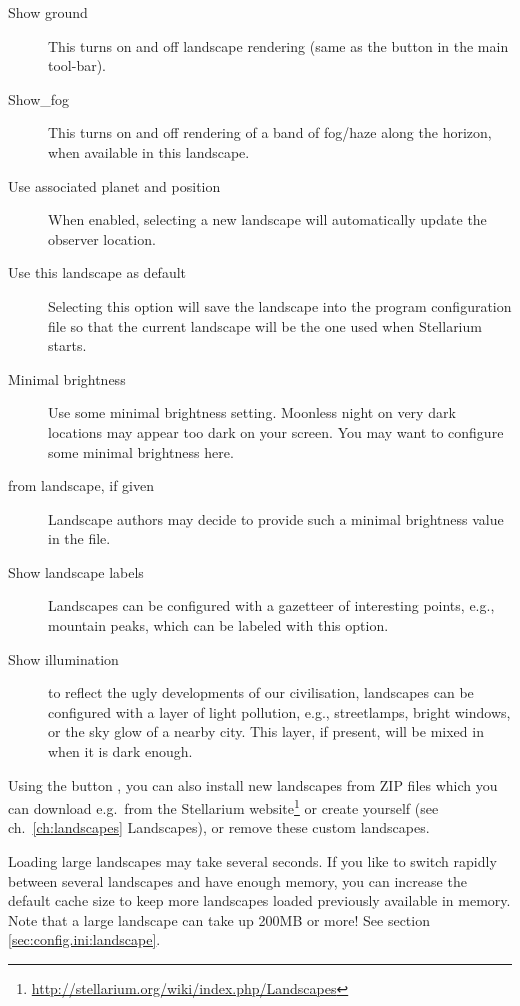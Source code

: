 \begin{description}
\item[Show ground] This turns on and off landscape rendering (same
  as the button  in the main tool-bar).
\item[Show\_fog] This turns on and off rendering of a band of
  fog/haze along the horizon, when available in this landscape.
\item[Use associated planet and position] When enabled, selecting a
  new landscape will automatically update the observer location.
\item[Use this landscape as default] Selecting this option will save
  the landscape into the program configuration file so that the current
  landscape will be the one used when Stellarium starts.
\item[Minimal brightness] Use some minimal brightness
  setting. Moonless night on very dark locations may appear too dark
  on your screen. You may want to configure some minimal brightness
  here.
\item[from landscape, if given] Landscape authors may decide to
  provide such a minimal brightness value in the 
  file.
\item[Show landscape labels] Landscapes can be configured with a
  gazetteer of interesting points, e.g., mountain peaks, which can be
  labeled with this option.
\item[Show illumination] to reflect the ugly developments of our
  civilisation, landscapes can be configured with a layer of light
  pollution, e.g., streetlamps, bright windows, or the sky glow of a
  nearby city. This layer, if present, will be mixed in when it is
  dark enough.
\end{description}

\noindent Using the button , you can also
install new landscapes from ZIP files which you can download e.g.\
from the Stellarium
website\footnote{\url{http://stellarium.org/wiki/index.php/Landscapes}}
or create yourself (see ch.~\ref{ch:landscapes} Landscapes), or remove
these custom landscapes.

Loading large landscapes may take several seconds. 
If you like to switch rapidly between several landscapes and have enough memory, 
you can increase the default cache size to keep more landscapes loaded previously 
available in memory. Note that a large landscape can take up 200MB or more! 
See section \ref{sec:config.ini:landscape}.

